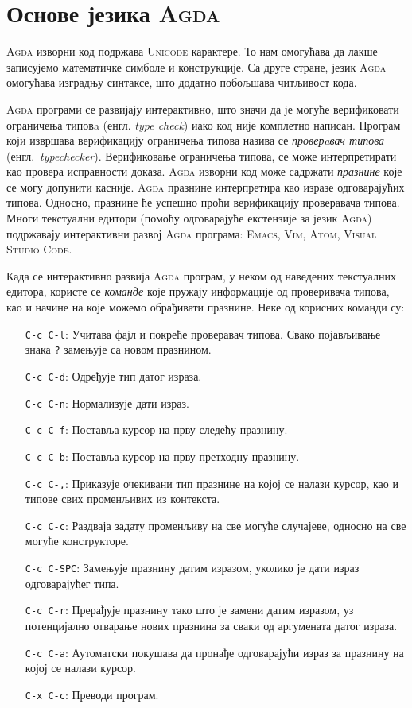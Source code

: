 \documentclass[12pt,oneside]{memoir}
\begin{document}
\section{Основе језика \textsc{Agda}}

\textsc{Agda} изворни код подржава \textsc{Unicode} карактере. То нам омогућава да лакше записујемо математичке симболе и конструкције. Са друге стране, језик \textsc{Agda} омогућава изградњу синтаксе, што додатно побољшава читљивост кода. 

\textsc{Agda} програми се развијају интерактивно, што значи да је могуће верификовати ограничења типовa (енгл. \emph{type check}) иако код није комплетно написан. Програм који извршава верификацију ограничења типова назива се \emph{проверaвач типова} (енгл.~\emph{typechecker}). Верификовање ограничења типова, се може интерпретирати као провера исправности доказа. \textsc{Agda} изворни код може садржати \emph{празнине} које се могу допунити касније. \textsc{Agda} празнине интерпретира као изразе одговарајућих типова. Односно, празнине ће успешно проћи верификацију проверавача типова. Многи текстуални едитори (помоћу одговарајуће екстензије за језик \textsc{Agda}) подржавају интерактивни развој \textsc{Agda} програма: \textsc{Emacs}, \textsc{Vim}, \textsc{Atom}, \textsc{Visual Studio Code}.

Када се интерактивно развија \textsc{Agda} програм, у неком од наведених текстуалних едитора, користе се \emph{команде} које пружају информације од проверивача типова, као и начине на које можемо обрађивати празнине. Неке од корисних команди су:

\begin{itemize}
    \item[\texttt{C-c C-l}:]{Учитава фајл и покреће проверавач типова. Свако појављивање знака \texttt{?} замењује са новом празнином.}
    \item[\texttt{C-c C-d}:]{Одређује тип датог израза.}
    \item[\texttt{C-c C-n}:]{Нормализује дати израз.}
    \item[\texttt{C-c C-f}:]{Поставља курсор на прву следећу празнину.}
    \item[\texttt{C-c C-b}:]{Поставља курсор на прву претходну празнину.}
    \item[\texttt{C-c C-,}:]{Приказује очекивани тип празнине на којој се налази курсор, као и типове свих променљивих из контекста.}
    \item[\texttt{C-c C-c}:]{Раздваја задату променљиву на све могуће случајеве, односно на све могуће конструкторе.}
    \item[\texttt{C-c C-SPC}:]{Замењује празнину датим изразом, уколико је дати израз одговарајућег типа.}
    \item[\texttt{C-c C-r}:]{Прерађује празнину тако што је замени датим изразом, уз потенцијално отварање нових празнина за сваки од аргумената датог израза.}
    \item[\texttt{C-c C-a}:]{Аутоматски покушава да пронађе одговарајући израз за празнину на којој се налази курсор.}
    \item[\texttt{C-x C-c}:]{Преводи програм.}
\end{itemize}
\end{document}

